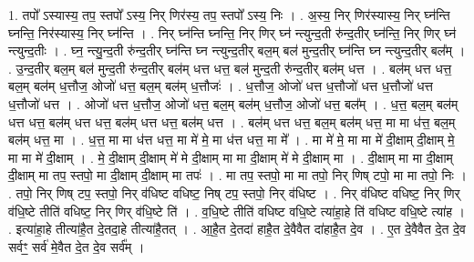 \documentclass[17pt]{extarticle}
\begin{document}
1. तपो᳚ ऽस्यास्य॒ तप॒ स्तपो᳚ ऽस्य॒ निर् णिर॑स्य॒ तप॒ स्तपो᳚ ऽस्य॒ निः । . अ॒स्य॒ निर् णिर॑स्यास्य॒ निर् घ्न॑न्ति घ्नन्ति॒ निर॑स्यास्य॒ निर् घ्न॑न्ति । . निर् घ्न॑न्ति घ्नन्ति॒ निर् णिर् घ्न॑ न्त्युन्द॒ती रु॑न्द॒तीर् घ्न॑न्ति॒ निर् णिर् घ्न॑ न्त्युन्द॒तीः । . घ्न॒ न्त्यु॒न्द॒ती रु॑न्द॒तीर् घ्न॑न्ति घ्न न्त्युन्द॒तीर् बल॒म् बल॑ मुन्द॒तीर् घ्न॑न्ति घ्न न्त्युन्द॒तीर् बल᳚म् । . उ॒न्द॒तीर् बल॒म् बल॑ मुन्द॒ती रु॑न्द॒तीर् बल॑म् धत्त धत्त॒ बल॑ मुन्द॒ती रु॑न्द॒तीर् बल॑म् धत्त । . बल॑म् धत्त धत्त॒ बल॒म् बल॑म् ध॒त्तौज॒ ओजो॑ धत्त॒ बल॒म् बल॑म् ध॒त्तौजः॑ । . ध॒त्तौज॒ ओजो॑ धत्त ध॒त्तौजो॑ धत्त ध॒त्तौजो॑ धत्त ध॒त्तौजो॑ धत्त । . ओजो॑ धत्त ध॒त्तौज॒ ओजो॑ धत्त॒ बल॒म् बल॑म् ध॒त्तौज॒ ओजो॑ धत्त॒ बल᳚म् । . ध॒त्त॒ बल॒म् बल॑म् धत्त धत्त॒ बल॑म् धत्त धत्त॒ बल॑म् धत्त धत्त॒ बल॑म् धत्त । . बल॑म् धत्त धत्त॒ बल॒म् बल॑म् धत्त॒ मा मा ध॑त्त॒ बल॒म् बल॑म् धत्त॒ मा । . ध॒त्त॒ मा मा ध॑त्त धत्त॒ मा मे॑ मे॒ मा ध॑त्त धत्त॒ मा मे᳚ । . मा मे॑ मे॒ मा मा मे॑ दी॒क्षाम् दी॒क्षाम् मे॒ मा मा मे॑ दी॒क्षाम् । . मे॒ दी॒क्षाम् दी॒क्षाम् मे॑ मे दी॒क्षाम् मा मा दी॒क्षाम् मे॑ मे दी॒क्षाम् मा । . दी॒क्षाम् मा मा दी॒क्षाम् दी॒क्षाम् मा तप॒ स्तपो॒ मा दी॒क्षाम् दी॒क्षाम् मा तपः॑ । . मा तप॒ स्तपो॒ मा मा तपो॒ निर् णिष् टपो॒ मा मा तपो॒ निः । . तपो॒ निर् णिष् टप॒ स्तपो॒ निर् व॑धिष्ट वधिष्ट॒ निष् टप॒ स्तपो॒ निर् व॑धिष्ट । . निर् व॑धिष्ट वधिष्ट॒ निर् णिर् व॑धि॒ष्टे तीति॑ वधिष्ट॒ निर् णिर् व॑धि॒ष्टे ति॑ । . व॒धि॒ष्टे तीति॑ वधिष्ट वधि॒ष्टे त्या॑हा॒हे ति॑ वधिष्ट वधि॒ष्टे त्या॑ह । . इत्या॑हा॒हे तीत्या॑है॒त दे॒तदा॒हे तीत्या॑है॒तत् । . आ॒है॒त दे॒तदा॑ हाहै॒त दे॒वैवैत दा॑हाहै॒त दे॒व । . ए॒त दे॒वैवैत दे॒त दे॒व सर्वꣳ॒॒ सर्व॑ मे॒वैत दे॒त दे॒व सर्व᳚म् । \newline
\end{document}
